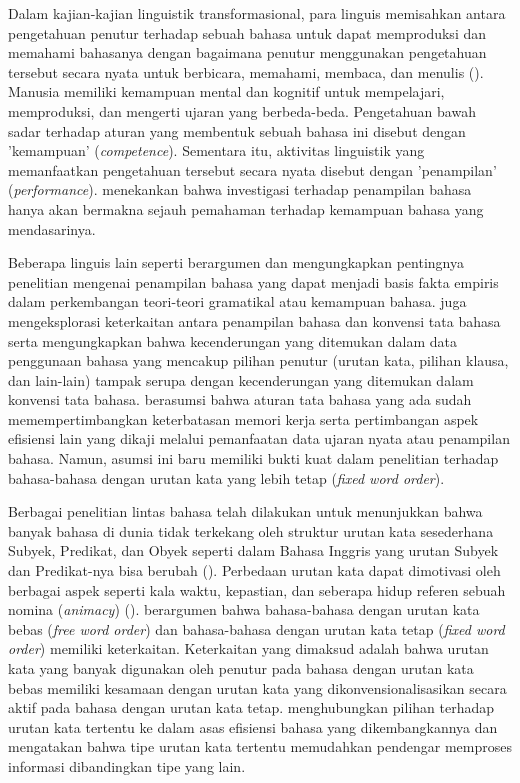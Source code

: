 Dalam kajian-kajian linguistik transformasional, para linguis memisahkan antara pengetahuan penutur terhadap sebuah bahasa untuk dapat memproduksi dan memahami bahasanya dengan bagaimana penutur menggunakan pengetahuan tersebut secara nyata untuk berbicara, memahami, membaca, dan menulis (\citealp{chomsky1965syntactic, delahuntygarvey2010soundsense}). Manusia memiliki kemampuan mental dan kognitif untuk mempelajari, memproduksi, dan mengerti ujaran yang berbeda-beda. Pengetahuan bawah sadar terhadap aturan yang membentuk sebuah bahasa ini disebut dengan 'kemampuan' (\textit{competence}). Sementara itu, aktivitas linguistik yang memanfaatkan pengetahuan tersebut secara nyata disebut dengan 'penampilan' (\textit{performance}). \cite{chomsky1965syntactic} menekankan bahwa investigasi terhadap penampilan bahasa hanya akan bermakna sejauh pemahaman terhadap kemampuan bahasa yang mendasarinya.

Beberapa linguis lain seperti \cite{sagwasow2011pccg} berargumen dan mengungkapkan pentingnya penelitian mengenai penampilan bahasa yang dapat menjadi basis fakta empiris dalam perkembangan teori-teori gramatikal atau kemampuan bahasa. \cite{hawkins2014cross} juga mengeksplorasi keterkaitan antara penampilan bahasa dan konvensi tata bahasa serta mengungkapkan bahwa kecenderungan yang ditemukan dalam data penggunaan bahasa yang mencakup pilihan penutur (urutan kata, pilihan klausa, dan lain-lain) tampak serupa dengan kecenderungan yang ditemukan dalam konvensi tata bahasa. \citet[pp. 4-6]{hawkins2014cross} berasumsi bahwa aturan tata bahasa yang ada sudah memempertimbangkan keterbatasan memori kerja serta pertimbangan aspek efisiensi lain yang dikaji melalui pemanfaatan data ujaran nyata atau penampilan bahasa. Namun, asumsi ini baru memiliki bukti kuat dalam penelitian terhadap bahasa-bahasa dengan urutan kata yang lebih tetap (\textit{fixed word order}). 

Berbagai penelitian lintas bahasa telah dilakukan untuk menunjukkan bahwa banyak bahasa di dunia tidak terkekang oleh struktur urutan kata sesederhana Subyek, Predikat, dan Obyek seperti dalam Bahasa Inggris yang urutan Subyek dan Predikat-nya bisa berubah (\citealp{macwhinneybates1989cross, birnerward1998noncanonical, lambrecht2000info}). Perbedaan urutan kata dapat dimotivasi oleh berbagai aspek seperti kala waktu, kepastian, dan seberapa hidup referen sebuah nomina (\textit{animacy}) (\citealp{dryer1992greenbergian, tsunoda1995adpositions, polinskaja1989object}). \cite{hawkins1994performance} berargumen bahwa bahasa-bahasa dengan urutan kata bebas (\textit{free word order}) dan bahasa-bahasa dengan urutan kata tetap (\textit{fixed word order}) memiliki keterkaitan. Keterkaitan yang dimaksud adalah bahwa urutan kata yang banyak digunakan oleh penutur pada bahasa dengan urutan kata bebas memiliki kesamaan dengan urutan kata yang dikonvensionalisasikan secara aktif pada bahasa dengan urutan kata tetap. \citet[p. 110]{hawkins1994performance} menghubungkan pilihan terhadap urutan kata tertentu ke dalam asas efisiensi bahasa yang dikembangkannya dan mengatakan bahwa tipe urutan kata tertentu memudahkan pendengar memproses informasi dibandingkan tipe yang lain.

